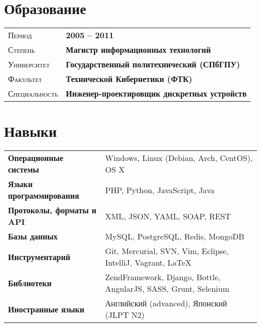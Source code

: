 \documentclass[a4paper, oneside, final]{scrartcl}
\newcommand{\gray}{\rowcolor[gray]{.90}}
\begin{document}
\begin{center}

\section{Образование}

\begin{tabularx}{0.97\linewidth}{>{\raggedleft\scshape}p{2.7cm}X}
    \gray Период & \textbf{2005 -- 2011} \\
    \gray Степень & \textbf{Магистр информационных технологий} \\
    \gray Университет & \textbf{Государственный политехнический (СПбГПУ)} \\
    \gray Факультет & \textbf{Технической Кибернетики (ФТК)} \\
    \gray Специальность & \textbf{Инженер-проектировщик дискретных устройств}
\end{tabularx}


\section{Навыки}

\begin{tabular}{ @{} >{\bfseries}l @{\hspace{6ex}} l }
    Операционные системы & Windows, Linux (Debian, Arch, CentOS), OS X \\
    Языки программирования & PHP, Python, JavaScript, Java \\
    Протоколы, форматы и API & XML, JSON, YAML, SOAP, REST \\
    Базы данных & MySQL, PostgreSQL, Redis, MongoDB \\
    Инструментарий & Git, Mercurial, SVN, Vim, Eclipse, IntelliJ, Vagrant, LaTeX \\
    Библиотеки & ZendFramework, Django, Bottle, AngularJS, SASS, Grunt, Selenium \\
    Иностранные языки & Английский (advanced), Японский (JLPT N2)
\end{tabular}


\end{center}
\end{document}
